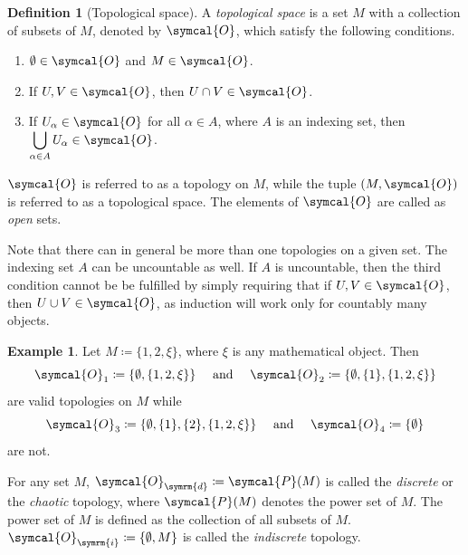 \documentclass[a4paper, 11pt]{book}
\theoremstyle{definition}
\newtheorem{defn}{Definition}
\newtheorem{exmp}{Example}
\newcommand{\topology}{\symcal{O}}
\newcommand{\powerset}{\symcal{P}}
\begin{document}
    \begin{defn}[Topological space]
        A \textit{topological space} is a set \(M\) with a collection of subsets of \(M\), denoted by \(\topology\), which satisfy the following conditions.
        \begin{enumerate}
            \item \(\emptyset \in \topology\) and \(M \in \topology\).
            \item If \(U, V \in \topology\), then \(U \cap V \in \topology\).
            \item If \(U_\alpha \in \topology\) for all \(\alpha \in A\), where \(A\) is an indexing set, then \(\displaystyle \bigcup_{\alpha \in A} U_\alpha \in \topology\). \label{topthirdcondition}
        \end{enumerate}
        \(\topology\) is referred to as a topology on \(M\), while the tuple \((M, \topology)\) is referred to as a topological space. The elements of \(\topology\) are called as \textit{open} sets.
    \end{defn}
    Note that there can in general be more than one topologies on a given set. The indexing set \(A\) can be uncountable as well. If \(A\) is uncountable, then the third condition cannot be be fulfilled by simply requiring that if \(U,V \in \topology\), then \(U \cup V \in \topology\), as induction will work only for countably many objects.
    \begin{exmp}
        Let \(M \coloneq \{1, 2, \xi\}\), where \(\xi\) is any mathematical object. Then \[\topology_1 \coloneq \{\emptyset, \{1, 2, \xi\}\} \quad \text{ and } \quad \topology_2 \coloneq \{\emptyset, \{1\}, \{1, 2, \xi\}\}\] are valid topologies on \(M\) while \[\topology_3 \coloneq \{\emptyset, \{1\}, \{2\}, \{1, 2, \xi\}\} \quad \text{ and } \quad \topology_4 \coloneq \{\emptyset\}\] are not.
    \end{exmp}
    For any set \(M\), \(\topology_{\symrm{d}} \coloneq \powerset(M)\) is called the \textit{discrete} or the \textit{chaotic} topology, where \(\powerset(M)\) denotes the power set of \(M\). The power set of \(M\) is defined as the collection of all subsets of \(M\). \(\topology_{\symrm{i}} \coloneq \{\emptyset, M\}\) is called the \textit{indiscrete} topology.
\end{document}
